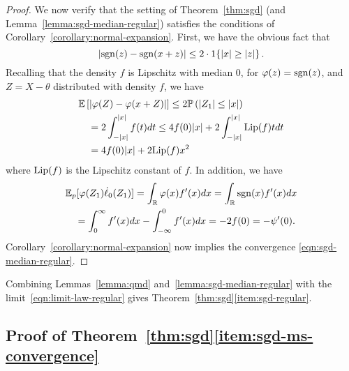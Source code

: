 \begin{proof}
  We now verify that the setting of Theorem~\ref{thm:sgd}
  (and Lemma~\ref{lemma:sgd-median-regular}) satisfies the
  conditions of Corollary~\ref{corollary:normal-expansion}. First, we have
  the obvious fact that
  \begin{equation*}
    |\mathrm{sgn}(z) - \mathrm{sgn}(x + z)|
    \le 2 \cdot 1\!\left\{|x| \ge |z|\right\}.
  \end{equation*}
  Recalling that the density $f$ is Lipschitz with median 0,
  for $\varphi(z) = \mathrm{sgn}(z)$, and $Z = X - \theta$ distributed with
  density $f$, we have
  \begin{align*}
    & \mathbb{E}\left[  \left| \varphi(Z) - \varphi(x + Z) \right| \right]
    \leq 2 \mathbb{P}\left( |Z_1| \le |x|  \right) \\
    & \quad = 2 \int_{-|x|}^{|x|} f(t) dt
    \le 4 f(0)|x| + 2 \int_{-|x|}^{|x|}
    {\rm \textup{Lip}}(f) t dt \\
     & \quad = 4 f(0) |x| + 2 {\rm \textup{Lip}}(f) x^2
  \end{align*}
  where ${\rm \textup{Lip}}(f)$ is the Lipschitz constant of $f$.
  In addition, we have
  \begin{align*}
& {\color{black} { \mathbb{E}_p[\varphi(Z_1) \dot{\ell}_0(Z_1)] }} = 
    \int_{\mathbb{R}} \varphi(x) f'(x ) dx
    = \int_{\mathbb{R}} \mathrm{sgn}(x) f'(x ) dx\\
     & \quad  =
    \int_0^\infty f'(x ) dx
    - \int_{-\infty}^0 f'(x ) dx
    = -2 f(0) = -\psi'(0).
  \end{align*}
  Corollary~\ref{corollary:normal-expansion}
  now implies the convergence \eqref{eqn:sgd-median-regular}.
\end{proof}

Combining Lemmas~\ref{lemma:qmd} and~\ref{lemma:sgd-median-regular}
with the limit~\eqref{eqn:limit-law-regular} gives
Theorem~\ref{thm:sgd}\eqref{item:sgd-regular}.

\subsection{Proof of Theorem~\ref{thm:sgd}\eqref{item:sgd-ms-convergence}}
\label{sec:proof-sgd-ms-convergence}

